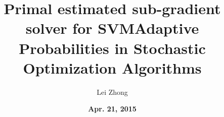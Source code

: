 \documentclass[first,firstsupp]{ETHclass} %
\title{Primal estimated sub-gradient solver for SVM}
\author{\small Lei Zhong}
\institute{\small Data Analytics Lab}
\date{\tiny \textbf{Apr. 21, 2015}}
\title{Adaptive Probabilities in Stochastic Optimization Algorithms}
\newcommand{\1}{\bm{1}}
\begin{document}
\begin{comment}
unconstrained case is nice

iteration cost of SDCA, iteration cost d

SMO
\end{comment}


%





\end{document}
